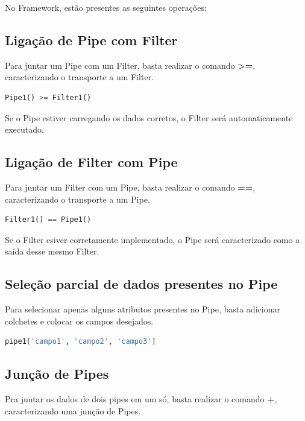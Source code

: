 \documentclass[portugues]{ic-tese}
\begin{document}
No Framework, estão presentes as seguintes operações:

\subsection{Ligação de Pipe com Filter}

Para juntar um Pipe com um Filter, basta realizar o comando \textbf{>=}, caracterizando o transporte a um Filter.

\begin{lstlisting}[language=Python, label=cod:PipeToFilter]
    Pipe1() >= Filter1()
\end{lstlisting}

Se o Pipe estiver carregando os dados corretos, o Filter será automaticamente executado.

\subsection{Ligação de Filter com Pipe}

Para juntar um Filter com um Pipe, basta realizar o comando \textbf{==}, caracterizando o transporte a um Pipe.

\begin{lstlisting}[language=Python, label=cod:FilterToPipe]
    Filter1() == Pipe1()
\end{lstlisting}

Se o Filter esiver corretamente implementado, o Pipe será caracterizado como a saída desse mesmo Filter.

\subsection{Seleção parcial de dados presentes no Pipe}

Para selecionar apenas alguns atributos presentes no Pipe, basta adicionar colchetes e colocar os campos desejados.

\begin{lstlisting}[language=Python, label=cod:PartialPipe]
    pipe1['campo1', 'campo2', 'campo3']
\end{lstlisting}

\subsection{Junção de Pipes}

Pra juntar os dados de dois pipes em um só, basta realizar o comando \textbf{+}, caracterizando uma junção de Pipes.
\end{document}
